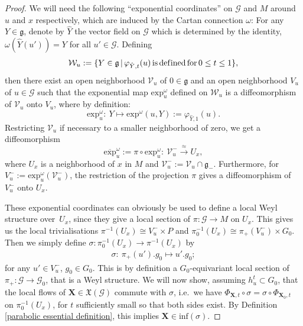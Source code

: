 \documentclass[11pt]{article}
\def\g{\mathfrak{g}}
\def\Gbdle{\mathcal{G}}
\def\VF{\mathfrak{X}}
\def\isom{\cong}
\theoremstyle{plain}
\theoremstyle{definition}
\begin{document}
\begin{proof} We will need the following ``exponential coordinates'' on $\Gbdle$ and $M$ around $u$ and $x$ respectively, which are induced by the Cartan connection $\omega$: For any $Y \in \g$, denote by $\hat{Y}$ the vector f\/ield on $\Gbdle$ which is determined by the identity, $\omega(\hat{Y}(u')) = Y$ for all $u' \in \Gbdle$. Def\/ining
\[
\mathcal{W}_u := \{ Y \in \g \, \vert \, \varphi_{\hat{Y},t}(u) \, \mathrm{is} \, \mathrm{def\/ined} \, \mathrm{for} \, 0 \leq t \leq 1 \},
\]
then there exist an open neighborhood $\mathcal{V}_u$ of $0 \in \g$ and an open neighborhood $V_u$ of $u \in \Gbdle$ such that the exponential map $\mathrm{exp}_u^{\omega}$ def\/ined on $\mathcal{W}_u$ is a dif\/feomorphism of $\mathcal{V}_u$ onto $V_u$, where by def\/inition:
\[
\mathrm{exp}_u^{\omega}: \  Y \mapsto \mathrm{exp}^{\omega}(u,Y) := \varphi_{\hat{Y},1}(u).
\]
Restricting $\mathcal{V}_u$ if necessary to a smaller neighborhood of zero, we get a dif\/feomorphism
\[
\overline{\mathrm{exp}}_u^{\omega} := \pi \circ \mathrm{exp}_u^{\omega}: \ \mathcal{V}_u^- \stackrel{\approx}{\rightarrow} U_x,
\]
where $U_x$ is a neighborhood of $x$ in $M$ and $\mathcal{V}_u^- := \mathcal{V}_u \cap \g_-$. Furthermore, for $V_u^- := \mathrm{exp}^{\omega}_u(\mathcal{V}_u^-)$, the restriction of the projection $\pi$ gives a dif\/feomorphism of $V_u^-$ onto $U_x$.

These exponential coordinates can obviously be used to def\/ine a local Weyl structure over~$U_x$, since they give a local section of $\pi: \Gbdle \rightarrow M$ on $U_x$. This gives us the local trivialisations $\pi^{-1}(U_x) \isom V_u^- \times P$ and $\pi_0^{-1}(U_x) \isom \pi_+(V_u^-) \times G_0$. Then we simply def\/ine $\sigma: \pi_0^{-1}(U_x) \rightarrow \pi^{-1}(U_x)$ by
\begin{gather}
\sigma: \ \pi_+(u').g_0 \mapsto u'.g_0; \label{exponential Weyl structure}
\end{gather}
for any $u' \in V_u^-$, $g_0 \in G_0$. This is by def\/inition a $G_0$-equivariant local section of $\pi_+: \Gbdle \rightarrow \Gbdle_0$, that is a Weyl structure. We will now show, assuming $h_u^t \subset G_0$, that the local f\/lows of $\mathbf{X} \in \VF(\Gbdle)$ commute with $\sigma$, i.e.\ we have $\Phi_{\mathbf{X},t} \circ \sigma = \sigma \circ \Phi_{\mathbf{X}_0,t}$ on $\pi_0^{-1}(U_x)$, for $t$ suf\/f\/iciently small so that both sides exist. By Def\/inition \ref{parabolic essential definition}, this implies $\mathbf{X} \in \mathrm{inf}(\sigma)$.


\end{proof}
\end{document}
